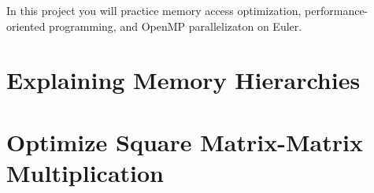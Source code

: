 \documentclass[unicode,11pt,a4paper,oneside,numbers=endperiod,openany]{scrartcl}
\begin{document}
\setassignment
{}

\newline

\assignmentpolicy
In this project you will practice memory access optimization, performance-oriented programming, and OpenMP parallelizaton 
on Euler.

\section{Explaining Memory Hierarchies }


\section{Optimize Square Matrix-Matrix Multiplication  }
\end{document}
